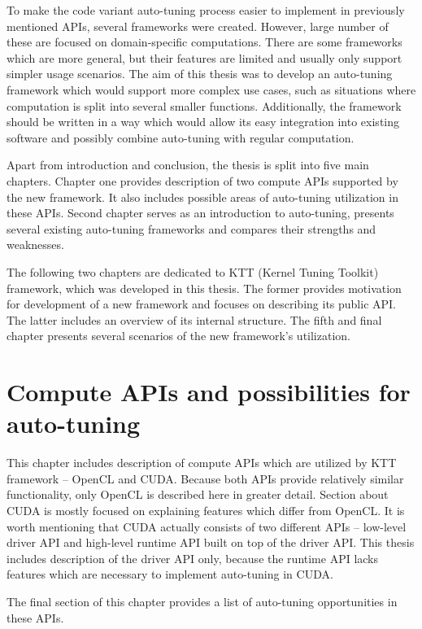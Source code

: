 \documentclass
[
    digital, %
    oneside, %
    table, %
    nolof, %
    nolot, %
    nocover %
]{fithesis3}
\begin{document}
To make the code variant auto-tuning process easier to implement in previously mentioned APIs, several frameworks were created. However, large number of
these are focused on domain-specific computations. There are some frameworks which are more general, but their features are limited and usually only
support simpler usage scenarios. The aim of this thesis was to develop an auto-tuning framework which would support more complex use cases, such as
situations where computation is split into several smaller functions. Additionally, the framework should be written in a way which would allow its easy
integration into existing software and possibly combine auto-tuning with regular computation.

Apart from introduction and conclusion, the thesis is split into five main chapters. Chapter one provides description of two compute APIs supported
by the new framework. It also includes possible areas of auto-tuning utilization in these APIs. Second chapter serves as an introduction to auto-tuning,
presents several existing auto-tuning frameworks and compares their strengths and weaknesses.

The following two chapters are dedicated to KTT (Kernel Tuning Toolkit) framework, which was developed in this thesis. The former provides motivation for
development of a new framework and focuses on describing its public API. The latter includes an overview of its internal structure. The fifth and final
chapter presents several scenarios of the new framework's utilization.

\chapter{Compute APIs and possibilities for auto-tuning}
This chapter includes description of compute APIs which are utilized by KTT framework -- OpenCL and CUDA. Because both APIs provide relatively similar
functionality, only OpenCL is described here in greater detail. Section about CUDA is mostly focused on explaining features which differ from OpenCL.
It is worth mentioning that CUDA actually consists of two different APIs -- low-level driver API and high-level runtime API built on top of the driver
API. This thesis includes description of the driver API only, because the runtime API lacks features which are necessary to implement auto-tuning in CUDA.

The final section of this chapter provides a list of auto-tuning opportunities in these APIs.
\end{document}
